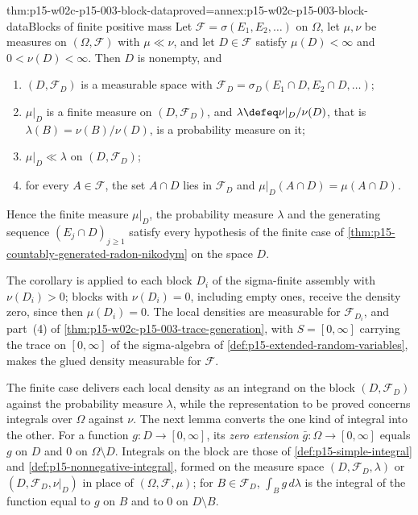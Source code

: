 \begin{hbcorollary}{thm:p15-w02c-p15-003-block-data}{proved=annex:p15-w02c-p15-003-block-data}{Blocks of finite positive mass}
Let \(\mathcal F=\sigma(E_1,E_2,\ldots)\) on \(\Omega\), let
\(\mu,\nu\) be measures on \((\Omega,\mathcal F)\) with \(\mu\ll\nu\),
and let \(D\in\mathcal F\) satisfy \(\mu(D)<\infty\) and
\(0<\nu(D)<\infty\). Then \(D\) is nonempty, and
\begin{enumerate}
\item \((D,\mathcal F_D)\) is a measurable space with
      \(\mathcal F_D=\sigma_D(E_1\cap D,E_2\cap D,\ldots)\);
\item \(\mu|_D\) is a finite measure on \((D,\mathcal F_D)\), and
      \(\lambda\defeq\nu|_D/\nu(D)\), that is
      \(\lambda(B)=\nu(B)/\nu(D)\), is a probability measure on it;
\item \(\mu|_D\ll\lambda\) on \((D,\mathcal F_D)\);
\item for every \(A\in\mathcal F\), the set \(A\cap D\) lies in
      \(\mathcal F_D\) and \(\mu|_D(A\cap D)=\mu(A\cap D)\).
\end{enumerate}
Hence the finite measure \(\mu|_D\), the probability measure \(\lambda\)
and the generating sequence \((E_j\cap D)_{j\geq1}\) satisfy every
hypothesis of the finite case of
\cref{thm:p15-countably-generated-radon-nikodym} on the space \(D\).
\end{hbcorollary}

The corollary is applied to each block \(D_i\) of the sigma-finite
assembly with \(\nu(D_i)>0\); blocks with \(\nu(D_i)=0\), including empty
ones, receive the density zero, since then \(\mu(D_i)=0\). The local
densities are measurable for \(\mathcal F_{D_i}\), and part~(4) of
\cref{thm:p15-w02c-p15-003-trace-generation}, with \(S=[0,\infty]\)
carrying the trace on \([0,\infty]\) of the sigma-algebra of
\cref{def:p15-extended-random-variables}, makes the glued density
measurable for \(\mathcal F\).

The finite case delivers each local density as an integrand on the block
\((D,\mathcal F_D)\) against the probability measure \(\lambda\), while
the representation to be proved concerns integrals over \(\Omega\) against
\(\nu\). The next lemma converts the one kind of integral into the other.
For a function \(g:D\to[0,\infty]\), its \emph{zero extension}
\(\bar g:\Omega\to[0,\infty]\) equals \(g\) on \(D\) and \(0\) on
\(\Omega\setminus D\). Integrals on the block are those of
\cref{def:p15-simple-integral} and \cref{def:p15-nonnegative-integral},
formed on the measure space \((D,\mathcal F_D,\lambda)\) or
\((D,\mathcal F_D,\nu|_D)\) in place of \((\Omega,\mathcal F,\mu)\);
for \(B\in\mathcal F_D\), \(\int_Bg\,d\lambda\) is the integral of the
function equal to \(g\) on \(B\) and to \(0\) on \(D\setminus B\).

